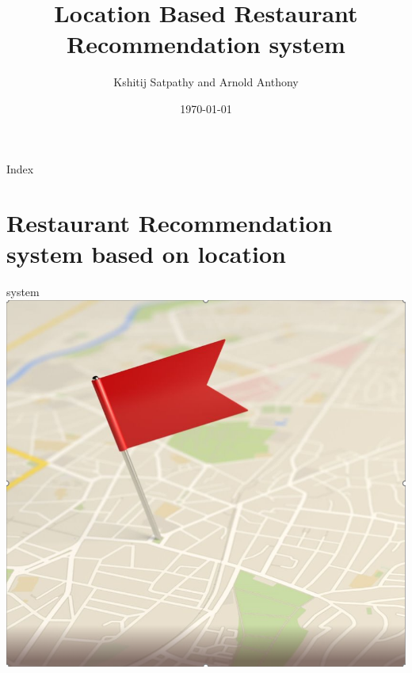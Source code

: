 \documentclass{if-beamer}
\title[Seminar]{Location Based Restaurant Recommendation system}
\subtitle{}
\author{Kshitij Satpathy and Arnold Anthony}
\institute[SIT]{
  Silicon institute of technology\\
  Sason sambalpur
}
\date{\today}
\begin{document}
\begin{frame}
  \titlepage
\end{frame}

\begin{frame}{Index}
  \tableofcontents
\end{frame}

\section{Restaurant Recommendation system based on location}
\begin{frame}{system}
	\includegraphics[scale=0.45]{figuras/pin.png}
	
\end{frame}
\end{document}
